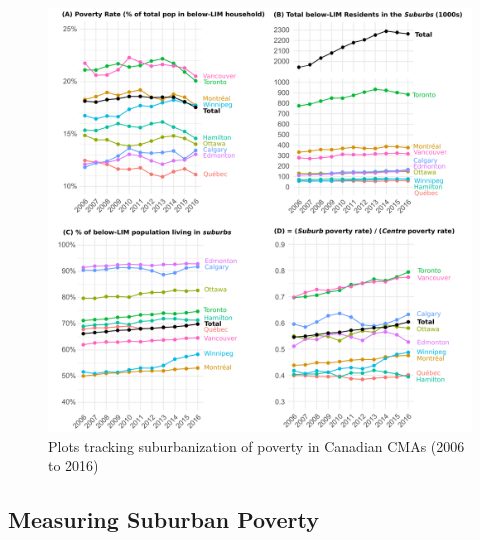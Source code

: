 \begin{figure}[H]
	\centering
	\includegraphics[width=6.5in]{figures/E_subpov4.png}
	\caption{Plots tracking suburbanization of poverty in Canadian CMAs (2006 to 2016)}
	\label{fig:subpov4}
\end{figure}


\subsection{Measuring Suburban Poverty}

